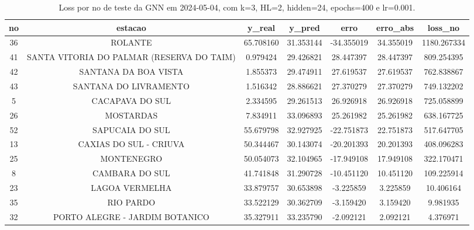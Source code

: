 \begin{table}[h]
\centering
\caption{Loss por no de teste da GNN em 2024-05-04, com k=3, HL=2, hidden=24, epochs=400 e lr=0.001.}
\label{tab:gnn_loss_k3_hl2_h24_e400_d20240504}
\begin{tabular}{ccccccc}
\toprule
no & estacao & y\_real & y\_pred & erro & erro\_abs & loss\_no \\
\midrule
36 & ROLANTE & 65.708160 & 31.353144 & -34.355019 & 34.355019 & 1180.267334 \\
41 & SANTA VITORIA DO PALMAR (RESERVA DO TAIM) & 0.979424 & 29.426821 & 28.447397 & 28.447397 & 809.254395 \\
42 & SANTANA DA BOA VISTA & 1.855373 & 29.474911 & 27.619537 & 27.619537 & 762.838867 \\
43 & SANTANA DO LIVRAMENTO & 1.516342 & 28.886621 & 27.370279 & 27.370279 & 749.132202 \\
5 & CACAPAVA DO SUL & 2.334595 & 29.261513 & 26.926918 & 26.926918 & 725.058899 \\
26 & MOSTARDAS & 7.834911 & 33.096893 & 25.261982 & 25.261982 & 638.167725 \\
52 & SAPUCAIA DO SUL & 55.679798 & 32.927925 & -22.751873 & 22.751873 & 517.647705 \\
13 & CAXIAS DO SUL - CRIUVA & 50.344467 & 30.143074 & -20.201393 & 20.201393 & 408.096283 \\
25 & MONTENEGRO & 50.054073 & 32.104965 & -17.949108 & 17.949108 & 322.170471 \\
8 & CAMBARA DO SUL & 41.741848 & 31.290728 & -10.451120 & 10.451120 & 109.225914 \\
23 & LAGOA VERMELHA & 33.879757 & 30.653898 & -3.225859 & 3.225859 & 10.406164 \\
35 & RIO PARDO & 33.522129 & 30.362709 & -3.159420 & 3.159420 & 9.981935 \\
32 & PORTO ALEGRE - JARDIM BOTANICO & 35.327911 & 33.235790 & -2.092121 & 2.092121 & 4.376971 \\
\bottomrule
\end{tabular}
\end{table}
